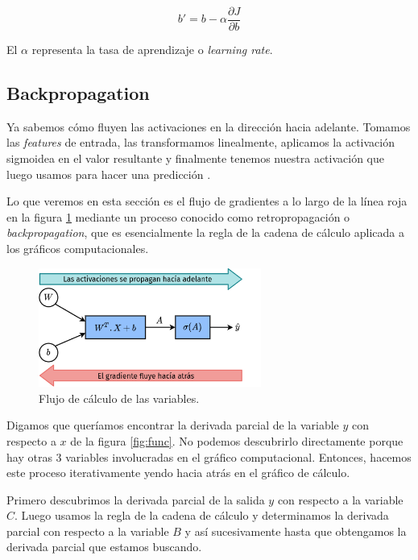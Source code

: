 \documentclass[a4paper,12pt]{article}
\begin{document}
\begin{equation}
	b' = b - \alpha \frac{\partial J}{\partial b}
\end{equation}

El $\alpha$ representa la tasa de aprendizaje o  \textit{learning rate}.

\subsection{Backpropagation}

Ya sabemos cómo fluyen las activaciones en la dirección hacia adelante. Tomamos las \textit{features} de entrada, las transformamos linealmente, aplicamos la activación sigmoidea en el valor resultante y finalmente tenemos nuestra activación que luego usamos para hacer una predicción \citep{sgd}.

Lo que veremos en esta sección es el flujo de gradientes a lo largo de la línea roja en la figura \ref{fig:back} mediante un proceso conocido como retropropagación o \textit{backpropagation}, que es esencialmente la regla de la cadena de cálculo aplicada a los gráficos computacionales.

\begin{figure}[H]
	\begin{center}				
		\includegraphics[width=0.65\textwidth]{024.png}
		\caption{Flujo de cálculo de las variables.}
		\label{fig:back}
	\end{center}
\end{figure}

Digamos que queríamos encontrar la derivada parcial de la variable $y$ con respecto a $x$ de la figura \ref{fig:func}. No podemos descubrirlo directamente porque hay otras 3 variables involucradas en el gráfico computacional. Entonces, hacemos este proceso iterativamente yendo hacia atrás en el gráfico de cálculo.

Primero descubrimos la derivada parcial de la salida $y$ con respecto a la variable $C$. Luego usamos la regla de la cadena de cálculo y determinamos la derivada parcial con respecto a la variable $B$ y así sucesivamente hasta que obtengamos la derivada parcial que estamos buscando.
\end{document}
